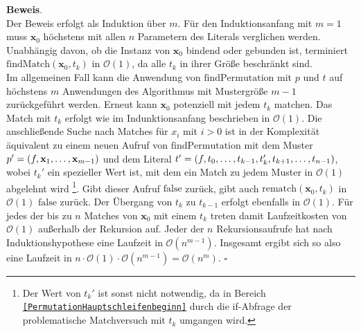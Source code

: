 \textbf{Beweis}.\\
Der Beweis erfolgt als Induktion über $m$.
Für den Induktionsanfang mit $m = 1$ muss $\mathbf x_0$ höchstens mit allen $n$ Parametern des Literals verglichen werden. Unabhängig davon, ob die Instanz von $\mathbf x_0$ bindend oder gebunden ist, terminiert $\mathrm{findMatch}(\mathbf x_0, t_k)$ in $\mathcal O(1)$, da alle $t_k$ in ihrer Größe beschränkt sind. \\
Im allgemeinen Fall kann die Anwendung von $\mathrm{findPermutation}$ mit $p$ und $t$ auf höchstens $m$ Anwendungen des Algorithmus mit Mustergröße $m-1$ zurückgeführt werden. Erneut kann $\mathbf x_0$ potenziell mit jedem $t_k$ matchen. Das Match mit $t_k$ erfolgt wie im Indunktionsanfang beschrieben in $\mathcal O (1)$. Die anschließende Suche nach Matches für $x_i$ mit $i > 0$ ist in der Komplexität äquivalent zu einem neuen Aufruf von $\mathrm{findPermutation}$ mit dem Muster $p' = (f, {\mathbf x}_{1}, \dots, {\mathbf x}_{m-1})$ und dem Literal $t' = (f, {t}_{0}, \dots, {t}_{k-1}, t_k', {t}_{k+1}, \dots, {t}_{n-1})$, wobei $t_k'$ ein spezieller Wert ist, mit dem ein Match zu jedem Muster in $\mathcal O (1)$ abgelehnt wird \footnote{Der Wert von $t_k'$ ist sonst nicht notwendig, da in Bereich \texttt{\ref{PermutationHauptschleifenbeginn}} durch die if-Abfrage der problematische Matchversuch mit $t_k$ umgangen wird.}. Gibt dieser Aufruf $\mathrm{false}$ zurück, gibt auch $\mathrm{rematch}(\mathbf x_0, t_k)$ in $\mathcal O (1)$ $\mathrm{false}$ zurück. Der Übergang von $t_k$ zu $t_{k-1}$ erfolgt ebenfalls in $\mathcal O (1)$. Für jedes der bis zu $n$ Matches von $\mathbf x_0$ mit einem $t_k$ treten damit Laufzeitkosten von $\mathcal O (1)$ außerhalb der Rekursion auf. Jeder der $n$ Rekursionsaufrufe hat nach Induktionshypothese eine Laufzeit in $\mathcal O (n^{m-1})$. Insgesamt ergibt sich so also eine Laufzeit in $n \cdot \mathcal O (1) \cdot \mathcal O (n^{m-1}) = \mathcal O (n^m)$.
\hfill $\square$\\


